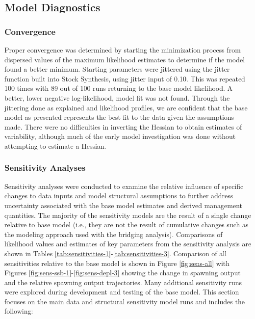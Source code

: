 \documentclass[11pt,
  english,
  letterpaper,
]{article}
\begin{document}
\hypertarget{model-diagnostics}{%
\subsection{Model Diagnostics}\label{model-diagnostics}}

\hypertarget{convergence}{%
\subsubsection{Convergence}\label{convergence}}

Proper convergence was determined by starting the minimization process from dispersed values of the maximum likelihood estimates to determine if the model found a better minimum. Starting parameters were jittered using the jitter function built into Stock Synthesis, using jitter input of 0.10. This was repeated 100 times with 89 out of 100 runs returning to the base model likelihood. A better, lower negative log-likelihood, model fit was not found. Through the jittering done as explained and likelihood profiles, we are confident that the base model as presented represents the best fit to the data given the assumptions made. There were no difficulties in inverting the Hessian to obtain estimates of variability, although much of the early model investigation was done without attempting to estimate a Hessian.

\hypertarget{sensitivity-analyses}{%
\subsubsection{Sensitivity Analyses}\label{sensitivity-analyses}}

Sensitivity analyses were conducted to examine the relative influence of specific changes to data inputs and model structural assumptions to further address uncertainty associated with the base model estimates and derived management quantities. The majority of the sensitivity models are the result of a single change relative to base model (i.e., they are not the result of cumulative changes such as the modeling approach used with the bridging analysis). Comparisons of likelihood values and estimates of key parameters from the sensitivity analysis are shown in Tables \ref{tab:sensitivities-1}-\ref{tab:sensitivities-3}. Comparison of all sensitivities relative to the base model is shown in Figure \ref{fig:sens-all} with Figures \ref{fig:sens-ssb-1}-\ref{fig:sens-depl-3} showing the change in spawning output and the relative spawning output trajectories. Many additional sensitivity runs were explored during development and testing of the base model. This section focuses on the main data and structural sensitivity model runs and includes the following:
\end{document}
